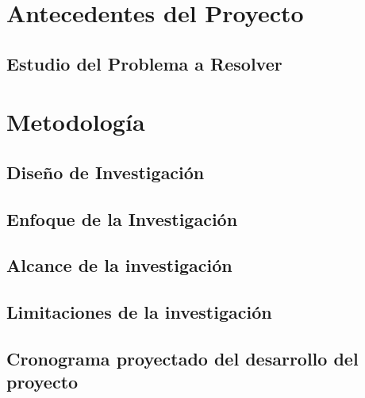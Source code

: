 \lipsum[5]
\section{Antecedentes del Proyecto}
\subsection{Estudio del Problema a Resolver}

\lipsum[6]

\section{Metodología}

\lipsum[6]

\subsection{Diseño de Investigación}

\lipsum[6]

\subsection{Enfoque de la Investigación}

\lipsum[6]

\subsection{Alcance de la investigación}

\lipsum[6]

\subsection{Limitaciones de la investigación}

\lipsum[6]

\subsection{Cronograma proyectado del desarrollo del proyecto}

\lipsum[6]


